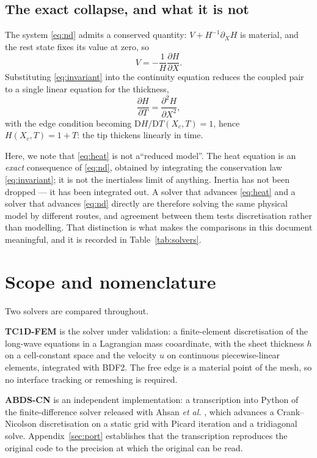 \documentclass[11pt,a4paper]{article}
\newcommand{\TC}{\textsf{TC1D-FEM}}
\newcommand{\AB}{\textsf{ABDS-CN}}
\newcommand{\Xc}{X_{c}}
\begin{document}
\subsection{The exact collapse, and what it is not}
\label{sec:collapse}

The system \eqref{eq:nd} admits a conserved quantity: $V + H^{-1}\partial_{X}H$
is material, and the rest state fixes its value at zero, so
\cite{ahsan2025}
%
\begin{equation}
  V = -\frac{1}{H}\frac{\partial H}{\partial X} .
  \label{eq:invariant}
\end{equation}
%
Substituting \eqref{eq:invariant} into the continuity equation reduces the
coupled pair to a single linear equation for the thickness,
%
\begin{equation}
  \frac{\partial H}{\partial T} = \frac{\partial^{2} H}{\partial X^{2}},
  \label{eq:heat}
\end{equation}
%
with the edge condition becoming $\mathrm{D}H/\mathrm{D}T(\Xc,T) = 1$, hence
$H(\Xc,T) = 1 + T$: the tip thickens linearly in time.

Here, we note that \eqref{eq:heat} is not a``reduced model''. The heat equation is an \emph{exact}
consequence of \eqref{eq:nd}, obtained by integrating the conservation law
\eqref{eq:invariant}; it is not the inertialess limit of anything. Inertia has
not been dropped --- it has been integrated out. A solver that advances
\eqref{eq:heat} and a solver that advances \eqref{eq:nd} directly are therefore
solving the same physical model by different routes, and agreement between them
tests discretisation rather than modelling. That distinction is what makes the
comparisons in this document meaningful, and it is recorded in
Table~\ref{tab:solvers}.

\section{Scope and nomenclature}

Two solvers are compared throughout.

\textbf{\TC} is the solver under validation: a finite-element discretisation of
the long-wave equations in a Lagrangian mass cooardinate, with the sheet
thickness $h$ on a cell-constant space and the velocity $u$ on continuous
piecewise-linear elements, integrated with BDF2. The free edge is a material
point of the mesh, so no interface tracking or remeshing is required.

\textbf{\AB} is an independent implementation: a transcription into Python of the
finite-difference solver released with Ahsan \textit{et al.} \cite{ahsan2025},
which advances a
Crank--Nicolson discretisation on a static grid with Picard iteration and a
tridiagonal solve. Appendix~\ref{sec:port} establishes that the transcription
reproduces the original code to the precision at which the original can be
read.
\end{document}
